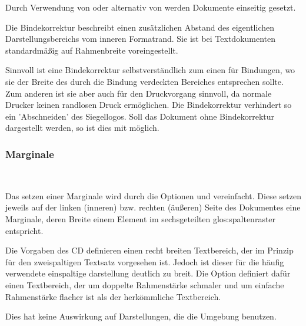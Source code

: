 Durch Verwendung von  oder alternativ
von  werden Dokumente einseitig gesetzt.

\begin{Declaration}
\end{Declaration}

Die Bindekorrektur beschreibt einen zusätzlichen Abstand des eigentlichen
Darstellungsbereichs vom inneren Formatrand.
Sie ist bei Textdokumenten standardmäßig auf Rahmenbreite voreingestellt.

Sinnvoll ist eine Bindekorrektur selbstverständlich zum einen für Bindungen,
wo sie der Breite des durch die Bindung verdeckten Bereiches entsprechen sollte.
Zum anderen ist sie aber auch für den Druckvorgang sinnvoll, da normale Drucker
keinen randlosen Druck ermöglichen.
Die Bindekorrektur verhindert so \zB ein 'Abschneiden' des Siegellogos.
Soll das Dokument ohne Bindekorrektur dargestellt werden, so ist dies
mit  möglich.

\subsubsection{Marginale}

\vspace*{-6mm}
\begin{Declaration}
  \\
\end{Declaration}

Das setzen einer Marginale wird durch die Optionen  und
 vereinfacht. Diese setzen jeweils auf der linken (inneren)
bzw. rechten (äußeren) Seite des Dokumentes eine Marginale, deren Breite
einem Element im sechsgeteilten \gls{glos:spaltenraster} entspricht.

\begin{Declaration}
\end{Declaration}%

Die Vorgaben des CD definieren einen recht breiten Textbereich, der im Prinzip
für den zweispaltigen Textsatz vorgesehen ist. Jedoch ist dieser für die häufig
verwendete einspaltige darstellung deutlich zu breit.
Die Option  definiert dafür einen Textbereich, der um
doppelte Rahmenstärke schmaler und um einfache Rahmenstärke flacher
ist als der herkömmliche Textbereich.
\begin{important}
Dies hat keine Auswirkung auf Darstellungen, die die Umgebung
 benutzen.
\end{important}

